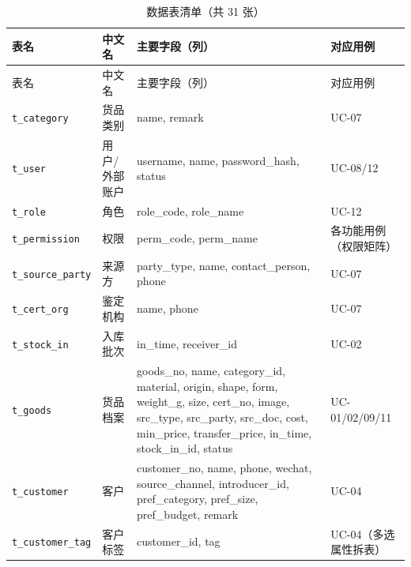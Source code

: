 \documentclass[12pt, a4paper]{ctexart}
\newcommand{\code}[1]{\texttt{\small #1}}
\begin{document}
\begin{longtable}{@{}p{3.3cm} p{1.9cm} p{5.7cm} p{2.3cm}@{}}
\caption{数据表清单（共 31 张）}\label{tab:tables}\\
\toprule
表名 & 中文名 & 主要字段（列） & 对应用例 \\
\midrule
\endfirsthead
\toprule
表名 & 中文名 & 主要字段（列） & 对应用例 \\
\midrule
\endhead
\bottomrule
\endlastfoot
\code{t\_category} & 货品类别 & name, remark & UC-07 \\
\code{t\_user} & 用户/外部账户 & username, name, password\_hash, status & UC-08/12 \\
\code{t\_role} & 角色 & role\_code, role\_name & UC-12 \\
\code{t\_permission} & 权限 & perm\_code, perm\_name & 各功能用例（权限矩阵） \\
\code{t\_source\_party} & 来源方 & party\_type, name, contact\_person, phone & UC-07 \\
\code{t\_cert\_org} & 鉴定机构 & name, phone & UC-07 \\
\code{t\_stock\_in} & 入库批次 & in\_time, receiver\_id & UC-02 \\
\code{t\_goods} & 货品档案 & goods\_no, name, category\_id, material, origin, shape, form, weight\_g, size, cert\_no, image, src\_type, src\_party, src\_doc, cost, min\_price, transfer\_price, in\_time, stock\_in\_id, status & UC-01/02/09/11 \\
\code{t\_customer} & 客户 & customer\_no, name, phone, wechat, source\_channel, introducer\_id, pref\_category, pref\_size, pref\_budget, remark & UC-04 \\
\code{t\_customer\_tag} & 客户标签 & customer\_id, tag & UC-04（多选属性拆表）\\


\end{longtable}
\end{document}
